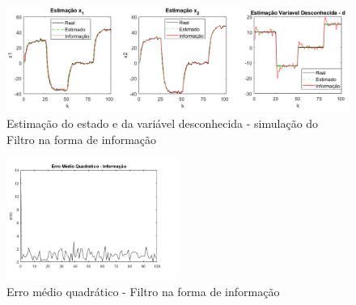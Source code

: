 \begin{frame}
	\begin{figure}
		\centering
		\includegraphics[width=1.05\textwidth]{figuras/estimacoes-info-color}
		\caption{Estimação do estado e da variável desconhecida - simulação do Filtro na forma de informação}
		\label{fig:estimacao-info}
	\end{figure}
\end{frame}

\begin{frame}
	\begin{figure}
		\centering
		\includegraphics[width=0.5\textwidth]{figuras/erro-comparacao-informacao}
		\caption{Erro médio quadrático - Filtro na forma de informação}
		\label{fig:erro-info}
	\end{figure}
\end{frame}